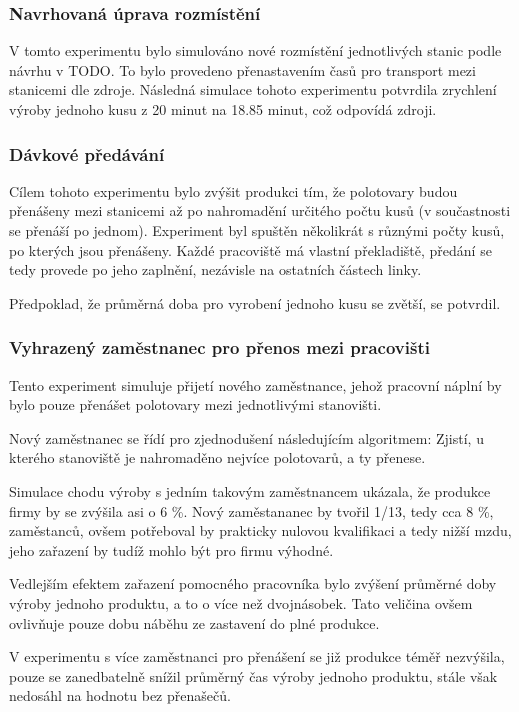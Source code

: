 \documentclass[11pt, a4paper]{article}
\begin{document}
\subsubsection{Navrhovaná úprava rozmístění}
V tomto experimentu bylo simulováno nové rozmístění jednotlivých stanic podle návrhu v TODO. To bylo provedeno přenastavením časů pro transport mezi stanicemi dle zdroje. Následná simulace tohoto experimentu potvrdila zrychlení výroby jednoho kusu z 20 minut na 18.85 minut, což odpovídá zdroji.


\subsubsection{Dávkové předávání}
Cílem tohoto experimentu bylo zvýšit produkci tím, že polotovary budou přenášeny mezi stanicemi až po nahromadění určitého počtu kusů (v součastnosti se přenáší po jednom). Experiment byl spuštěn několikrát s různými počty kusů, po kterých jsou přenášeny. Každé pracoviště má vlastní překladiště, předání se tedy provede po jeho zaplnění, nezávisle na ostatních částech linky.

Předpoklad, že průměrná doba pro vyrobení jednoho kusu se zvětší, se potvrdil.


\subsubsection{Vyhrazený zaměstnanec pro přenos mezi pracovišti}
Tento experiment simuluje přijetí nového zaměstnance, jehož pracovní náplní by bylo pouze přenášet polotovary mezi jednotlivými stanovišti.

Nový zaměstnanec se řídí pro zjednodušení následujícím algoritmem: Zjistí, u kterého stanoviště je nahromaděno nejvíce polotovarů, a ty přenese.

Simulace chodu výroby s jedním takovým zaměstnancem ukázala, že produkce firmy by se zvýšila asi o 6 \%. Nový zaměstananec by tvořil 1/13, tedy cca 8 \%, zaměstanců, ovšem potřeboval by prakticky nulovou kvalifikaci a tedy nižší mzdu, jeho zařazení by tudíž mohlo být pro firmu výhodné.

Vedlejším efektem zařazení pomocného pracovníka bylo zvýšení průměrné doby výroby jednoho produktu, a to o více než dvojnásobek. Tato veličina ovšem ovlivňuje pouze dobu náběhu ze zastavení do plné produkce.


V experimentu s více zaměstnanci pro přenášení se již produkce téměř nezvýšila, pouze se zanedbatelně snížil průměrný čas výroby jednoho produktu, stále však nedosáhl na hodnotu bez přenašečů.
\end{document}
